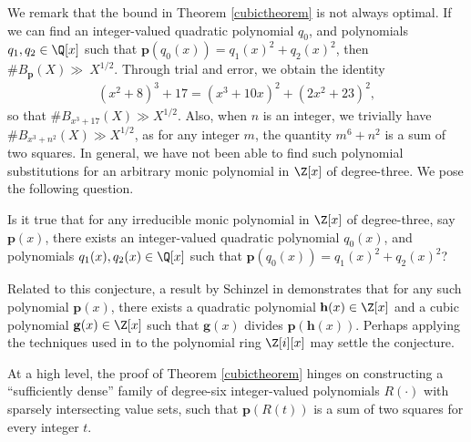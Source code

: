 \documentclass[12pt]{amsart}
\newcommand{\1}{\mathmybb{1}}
\begin{document}
We remark that the bound in Theorem \ref{cubictheorem} is not always optimal. If we can find an integer-valued quadratic polynomial $q_{0}$, and polynomials $q_{1},q_{2} \in \Q[x]$ such that $\mathbf{p}(q_{0}(x)) = q_{1}(x)^2 +q_{2}(x)^2$, then $\#B_{\mathbf{p}}(X) \gg ~ X^{1/2}$. Through trial and error, we obtain the identity
\begin{align*}
(x^2+8)^3+17 = (x^3+10x)^2+(2x^2+23)^2,
\end{align*}
so that $\#B_{x^3+17}(X) \gg X^{1/2}$. Also, when $n$ is an integer, we trivially have $\#B_{x^3+n^2}(X) \gg X^{1/2}$, as for any integer $m$, the quantity $m^6+n^2$ is a sum of two squares. In general, we have not been able to find such polynomial substitutions for an arbitrary monic polynomial in $\Z[x]$ of degree-three. We pose the following question. 
\begin{question}
Is it true that for any irreducible monic polynomial in $\Z[x]$ of degree-three, say $\mathbf{p}(x)$, there exists an integer-valued quadratic polynomial $q_{0}(x)$, and polynomials $q_{1}(x),q_{2}(x) \in \Q[x]$ such that $\mathbf{p}(q_{0}(x)) = q_{1}(x)^2 +q_{2}(x)^2$?
\end{question}
Related to this conjecture, a result by Schinzel in \cite[Lemma 10]{Schinzel} demonstrates that for any such polynomial $\mathbf{p}(x)$, there exists a quadratic polynomial $\mathbf{h}(x) \in \Z[x]$ and a cubic polynomial $\mathbf{g}(x) \in \Z[x]$ such that $\mathbf{g}(x)$ divides $\mathbf{p}(\mathbf{h}(x))$. Perhaps applying the techniques used in \cite{Schinzel} to the polynomial ring $\Z[i][x]$ may settle the conjecture.

At a high level, the proof of Theorem \ref{cubictheorem} hinges on constructing a ``sufficiently dense'' family of degree-six integer-valued polynomials $R(\cdot)$ with sparsely intersecting value sets, such that $\mathbf{p}(R(t))$ is a sum of two squares for every integer $t$.
\end{document}
